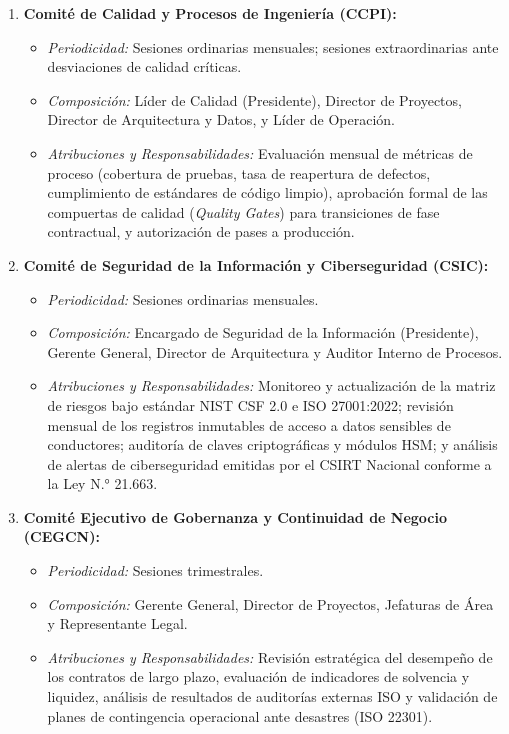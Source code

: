 \begin{enumerate}
  \item \textbf{Comité de Calidad y Procesos de Ingeniería (CCPI):}
  \begin{itemize}
    \item \textit{Periodicidad:} Sesiones ordinarias mensuales; sesiones extraordinarias ante desviaciones de calidad críticas.
    \item \textit{Composición:} Líder de Calidad (Presidente), Director de Proyectos, Director de Arquitectura y Datos, y Líder de Operación.
    \item \textit{Atribuciones y Responsabilidades:} Evaluación mensual de métricas de proceso (cobertura de pruebas, tasa de reapertura de defectos, cumplimiento de estándares de código limpio), aprobación formal de las compuertas de calidad (\textit{Quality Gates}) para transiciones de fase contractual, y autorización de pases a producción.
  \end{itemize}

  \item \textbf{Comité de Seguridad de la Información y Ciberseguridad (CSIC):}
  \begin{itemize}
    \item \textit{Periodicidad:} Sesiones ordinarias mensuales.
    \item \textit{Composición:} Encargado de Seguridad de la Información (Presidente), Gerente General, Director de Arquitectura y Auditor Interno de Procesos.
    \item \textit{Atribuciones y Responsabilidades:} Monitoreo y actualización de la matriz de riesgos bajo estándar NIST CSF 2.0 e ISO 27001:2022; revisión mensual de los registros inmutables de acceso a datos sensibles de conductores; auditoría de claves criptográficas y módulos HSM; y análisis de alertas de ciberseguridad emitidas por el CSIRT Nacional conforme a la Ley N.° 21.663.
  \end{itemize}

  \item \textbf{Comité Ejecutivo de Gobernanza y Continuidad de Negocio (CEGCN):}
  \begin{itemize}
    \item \textit{Periodicidad:} Sesiones trimestrales.
    \item \textit{Composición:} Gerente General, Director de Proyectos, Jefaturas de Área y Representante Legal.
    \item \textit{Atribuciones y Responsabilidades:} Revisión estratégica del desempeño de los contratos de largo plazo, evaluación de indicadores de solvencia y liquidez, análisis de resultados de auditorías externas ISO y validación de planes de contingencia operacional ante desastres (ISO 22301).
  \end{itemize}
\end{enumerate}

